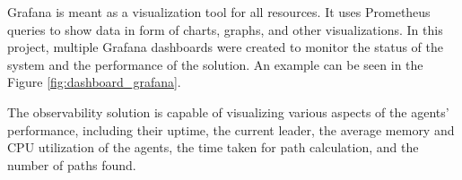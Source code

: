 Grafana is meant as a visualization tool for all resources. It uses Prometheus queries to show data in form of charts, graphs, and other visualizations. In this project, multiple Grafana dashboards were created to monitor the status of the system and the performance of the solution. An example can be seen in the Figure \ref{fig:dashboard_grafana}.

The observability solution is capable of visualizing various aspects of the agents' performance, including their uptime, the current leader, the average memory and CPU utilization of the agents, the time taken for path calculation, and the number of paths found.
